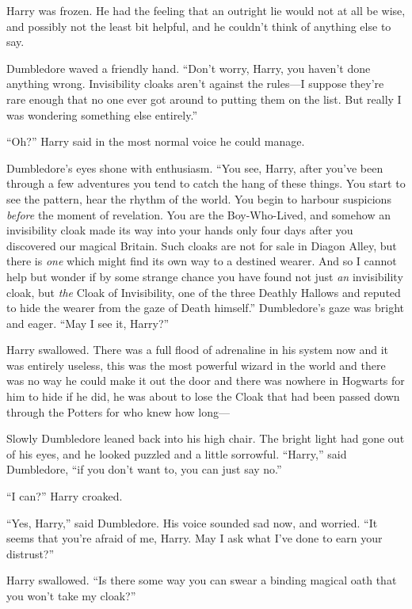 Harry was frozen. He had the feeling that an outright lie would not at
all be wise, and possibly not the least bit helpful, and he couldn't
think of anything else to say.

Dumbledore waved a friendly hand. ``Don't worry, Harry, you haven't done
anything wrong. Invisibility cloaks aren't against the rules---I suppose
they're rare enough that no one ever got around to putting them on the
list. But really I was wondering something else entirely.''

``Oh?'' Harry said in the most normal voice he could manage.

Dumbledore's eyes shone with enthusiasm. ``You see, Harry, after you've
been through a few adventures you tend to catch the hang of these
things. You start to see the pattern, hear the rhythm of the world. You
begin to harbour suspicions \emph{before} the moment of revelation. You
are the Boy-Who-Lived, and somehow an invisibility cloak made its way
into your hands only four days after you discovered our magical Britain.
Such cloaks are not for sale in Diagon Alley, but there is \emph{one}
which might find its own way to a destined wearer. And so I cannot help
but wonder if by some strange chance you have found not just \emph{an}
invisibility cloak, but \emph{the} Cloak of Invisibility, one of the
three Deathly Hallows and reputed to hide the wearer from the gaze of
Death himself.'' Dumbledore's gaze was bright and eager. ``May I see it,
Harry?''

Harry swallowed. There was a full flood of adrenaline in his system now
and it was entirely useless, this was the most powerful wizard in the
world and there was no way he could make it out the door and there was
nowhere in Hogwarts for him to hide if he did, he was about to lose the
Cloak that had been passed down through the Potters for who knew how
long---

Slowly Dumbledore leaned back into his high chair. The bright light had
gone out of his eyes, and he looked puzzled and a little sorrowful.
``Harry,'' said Dumbledore, ``if you don't want to, you can just say
no.''

``I can?'' Harry croaked.

``Yes, Harry,'' said Dumbledore. His voice sounded sad now, and worried.
``It seems that you're afraid of me, Harry. May I ask what I've done to
earn your distrust?''

Harry swallowed. ``Is there some way you can swear a binding magical
oath that you won't take my cloak?''

